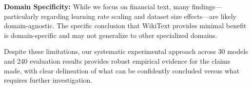 \textbf{Domain Specificity:} While we focus on financial text, many findings—particularly regarding learning rate scaling and dataset size effects—are likely domain-agnostic. The specific conclusion that WikiText provides minimal benefit is domain-specific and may not generalize to other specialized domains.

Despite these limitations, our systematic experimental approach across 30 models and 240 evaluation results provides robust empirical evidence for the claims made, with clear delineation of what can be confidently concluded versus what requires further investigation.
